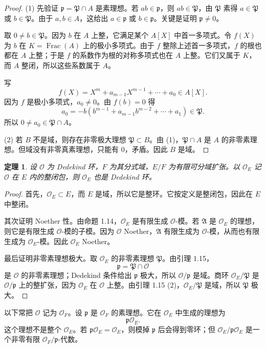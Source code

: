 \documentclass[11pt,a4paper,openany]{ctexbook}
\numberwithin{equation}{chapter}
\theoremstyle{plain}
\newtheorem{theorem}{定理}[chapter]
\theoremstyle{definition}
\theoremstyle{remark}
\begin{document}
\begin{proof}
(1) 先验证 $\mathfrak p=\mathfrak P\cap A$ 是素理想。若 $ab\in\mathfrak p$，则 $ab\in\mathfrak P$，由 $\mathfrak P$ 素得 $a\in\mathfrak P$ 或 $b\in\mathfrak P$。由于 $a,b\in A$，这给出 $a\in\mathfrak p$ 或 $b\in\mathfrak p$。关键是证明 $\mathfrak p\ne0$。

取 $0\ne b\in\mathfrak P$。因为 $b$ 在 $A$ 上整，它满足某个 $A[X]$ 中首一多项式。令 $f(X)$ 为 $b$ 在 $K=\operatorname{Frac}(A)$ 上的极小多项式。由于 $f$ 整除上述首一多项式，$f$ 的根也都在 $A$ 上整；于是 $f$ 的系数作为根的对称多项式也在 $A$ 上整。它们又属于 $K$，而 $A$ 整闭，所以这些系数属于 $A$。

写
\[
f(X)=X^m+a_{m-1}X^{m-1}+\cdots+a_0\in A[X].
\]
因为 $f$ 是极小多项式，$a_0\ne0$。由 $f(b)=0$ 得
\[
a_0=-b(b^{m-1}+a_{m-1}b^{m-2}+\cdots+a_1)\in\mathfrak P.
\]
所以 $0\ne a_0\in\mathfrak P\cap A$。

(2) 若 $B$ 不是域，则存在非零极大理想 $\mathfrak P\subset B$。由 (1)，$\mathfrak P\cap A$ 是 $A$ 的非零素理想。但域没有非零真素理想，只能有 $0$，矛盾。因此 $B$ 是域。
\end{proof}

\begin{theorem}
设 $\mathcal O$ 为 Dedekind 环，$F$ 为其分式域，$E/F$ 为有限可分域扩张。以 $\mathcal O_E$ 记 $\mathcal O$ 在 $E$ 内的整闭包，则 $\mathcal O_E$ 也是 Dedekind 环。
\end{theorem}

\begin{proof}
首先，$\mathcal O_E\subset E$，而 $E$ 是域，所以它是整环。它按定义是整闭包，因此在 $E$ 中整闭。

其次证明 Noether 性。由命题 1.14，$\mathcal O_E$ 是有限生成 $\mathcal O$-模。若 $\mathfrak A$ 是 $\mathcal O_E$ 的理想，则它是有限生成 $\mathcal O$-模的子模。因为 $\mathcal O$ Noether，$\mathfrak A$ 有限生成为 $\mathcal O$-模，从而也有限生成为 $\mathcal O_E$-模。因此 $\mathcal O_E$ Noether。

最后证明非零素理想极大。取 $\mathcal O_E$ 的非零素理想 $\mathfrak P$。由引理 1.15，
\[
\mathfrak p=\mathfrak P\cap\mathcal O
\]
是 $\mathcal O$ 的非零素理想；Dedekind 条件给出 $\mathfrak p$ 极大，所以 $\mathcal O/\mathfrak p$ 是域。商环 $\mathcal O_E/\mathfrak P$ 是 $\mathcal O/\mathfrak p$ 上的整扩张，因为 $\mathcal O_E$ 在 $\mathcal O$ 上整。由引理 1.15 (2)，$\mathcal O_E/\mathfrak P$ 是域，所以 $\mathfrak P$ 极大。
\end{proof}

以下常把 $\mathcal O$ 记为 $\mathcal O_F$。设 $\mathfrak p$ 是 $\mathcal O_F$ 的素理想。它在 $\mathcal O_E$ 中生成的理想为
\[
\mathfrak p\mathcal O_E.
\]
这个理想不是整个 $\mathcal O_E$。若 $\mathfrak p\mathcal O_E=\mathcal O_E$，则模掉 $\mathfrak p$ 后会得到零环；但 $\mathcal O_E/\mathfrak p\mathcal O_E$ 是一个非零有限 $\mathcal O_F/\mathfrak p$-代数。
\end{document}
